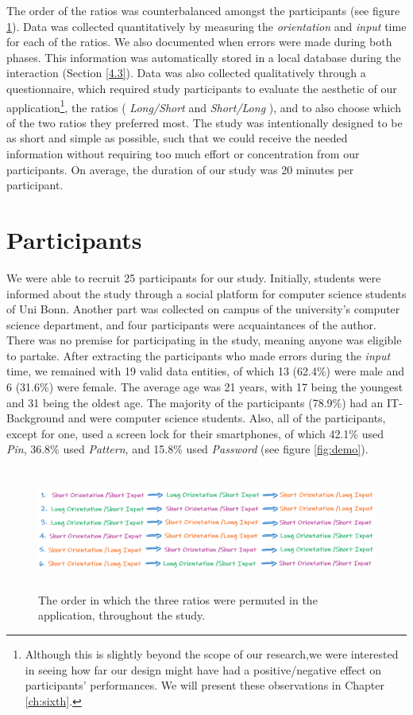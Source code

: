 The order of the ratios was counterbalanced amongst the participants (see figure \ref{fig:permutation}). Data was collected quantitatively by measuring the \textit{orientation} and \textit{input} time for each of the ratios. We also documented when errors were made during both phases. This information was automatically stored in a local database during the interaction (Section \ref{4.3}). Data was also collected qualitatively through a questionnaire, which required study participants to evaluate the aesthetic of our application\footnote{Although this is slightly beyond the scope of our research,we were interested in seeing how far our design might have had a positive/negative effect on participants' performances. We will present these observations in Chapter \ref{ch:sixth}.}, the ratios ( \textit{Long/Short} and \textit{Short/Long} ), and to also choose which of the two ratios they preferred most. The study was intentionally designed to be as short and simple as possible, such that we could receive the needed information without requiring too much effort or concentration from our participants. On average, the duration of our study was 20 minutes per participant. 

\section{Participants} \label{5.2}

We were able to recruit 25 participants for our study. Initially, students were informed about the study through a social platform for computer science students of Uni Bonn. Another part was collected on campus of the university's computer science department, and four participants were acquaintances of the author. There was no premise for participating in the study, meaning anyone was eligible to partake. After extracting the participants who made errors during the \textit{input} time, we remained with 19 valid data entities, of which 13 (62.4\%) were male and 6 (31.6\%) were female. The average age was 21 years, with 17 being the youngest and 31 being the oldest age. The majority of the participants (78.9\%) had an IT-Background and were computer science students. Also, all of the participants, except for one, used a screen lock for their smartphones, of which 42.1\% used \textit{Pin}, 36.8\% used \textit{Pattern}, and 15.8\% used \textit{Password} (see figure \ref{fig:demo}). 

\begin{figure}[t!]
\centering
\includegraphics[width=14cm, height=4cm]{Chapters/graphics/permutation.PNG}
\caption{The order in which the three ratios were permuted in the application, throughout the study.}
\label{fig:permutation}
\end{figure}


